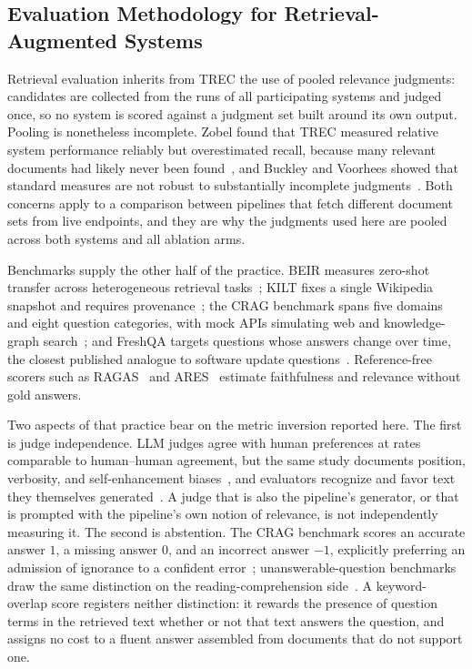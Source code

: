 \subsection{Evaluation Methodology for Retrieval-Augmented Systems}

Retrieval evaluation inherits from TREC the use of pooled relevance judgments:
candidates are collected from the runs of all participating systems and judged
once, so no system is scored against a judgment set built around its own output.
Pooling is nonetheless incomplete. Zobel found that TREC measured relative system
performance reliably but overestimated recall, because many relevant documents
had likely never been found~\cite{zobel1998reliable}, and Buckley and Voorhees
showed that standard measures are not robust to substantially incomplete
judgments~\cite{buckley2004incomplete}. Both concerns apply to a comparison
between pipelines that fetch different document sets from live endpoints, and
they are why the judgments used here are pooled across both systems and all
ablation arms.

Benchmarks supply the other half of the practice. BEIR measures zero-shot
transfer across heterogeneous retrieval tasks~\cite{thakur2021beir}; KILT fixes a
single Wikipedia snapshot and requires provenance~\cite{petroni2021kilt}; the
CRAG benchmark spans five domains and eight question categories, with mock APIs
simulating web and knowledge-graph search~\cite{yang2024}; and FreshQA targets
questions whose answers change over time, the closest published analogue to
software update questions~\cite{vu2024freshllms}. Reference-free scorers such as
RAGAS~\cite{es2024ragas} and ARES~\cite{saadfalcon2024ares} estimate
faithfulness and relevance without gold answers.

Two aspects of that practice bear on the metric inversion reported here. The
first is judge independence. LLM judges agree with human preferences at rates
comparable to human--human agreement, but the same study documents position,
verbosity, and self-enhancement biases~\cite{zheng2023judge}, and evaluators
recognize and favor text they themselves generated~\cite{panickssery2024self}. A
judge that is also the pipeline's generator, or that is prompted with the
pipeline's own notion of relevance, is not independently measuring it. The second
is abstention. The CRAG benchmark scores an accurate answer $1$, a missing answer
$0$, and an incorrect answer $-1$, explicitly preferring an admission of
ignorance to a confident
error~\cite{yang2024}; unanswerable-question benchmarks draw the same
distinction on the reading-comprehension side~\cite{rajpurkar2018squad2}. A
keyword-overlap score registers neither distinction: it rewards the presence of
question terms in the retrieved text whether or not that text answers the
question, and assigns no cost to a fluent answer assembled from documents that do
not support one.

